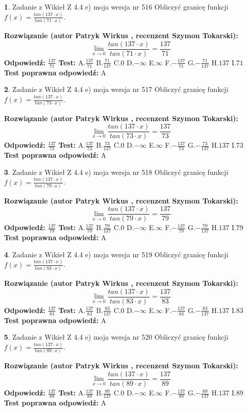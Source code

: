 \documentclass[12pt, a4paper]{article}
\theoremstyle{definition} %
\newtheorem{zad}{}
\newcommand{\zadStart}[1]{\begin{zad}#1\newline}
\newcommand{\zadStop}{\end{zad}}
\newcommand{\rozwStart}[2]{\noindent \textbf{Rozwiązanie (autor #1 , recenzent #2): }\newline}
\newcommand{\rozwStop}{\newline}
\newcommand{\odpStart}{\noindent \textbf{Odpowiedź:}\newline}
\newcommand{\odpStop}{\newline}
\newcommand{\testStart}{\noindent \textbf{Test:}\newline}
\newcommand{\testStop}{\newline}
\newcommand{\kluczStart}{\noindent \textbf{Test poprawna odpowiedź:}\newline}
\newcommand{\kluczStop}{\newline}
\begin{document}
\zadStart{Zadanie z Wikieł Z 4.4 e) moja wersja nr 516}
Obliczyć granicę funkcji $f(x)=\frac{tan(137\cdot x)}{tan(71\cdot x)}$.
\zadStop
\rozwStart{Patryk Wirkus}{Szymon Tokarski}
$$\lim\limits_{x\to 0}\frac{tan(137\cdot x)}{tan(71\cdot x)}=
\frac{137}{71}$$
\rozwStop
\odpStart
$\frac{137}{71}$
\odpStop
\testStart
A.$\frac{137}{71}$
B.$\frac{71}{137}$
C.$0$
D.$-\infty$
E.$\infty$
F.$-\frac{137}{71}$
G.$-\frac{71}{137}$
H.$137$
I.$71$
\testStop
\kluczStart
A
\kluczStop



\zadStart{Zadanie z Wikieł Z 4.4 e) moja wersja nr 517}
Obliczyć granicę funkcji $f(x)=\frac{tan(137\cdot x)}{tan(73\cdot x)}$.
\zadStop
\rozwStart{Patryk Wirkus}{Szymon Tokarski}
$$\lim\limits_{x\to 0}\frac{tan(137\cdot x)}{tan(73\cdot x)}=
\frac{137}{73}$$
\rozwStop
\odpStart
$\frac{137}{73}$
\odpStop
\testStart
A.$\frac{137}{73}$
B.$\frac{73}{137}$
C.$0$
D.$-\infty$
E.$\infty$
F.$-\frac{137}{73}$
G.$-\frac{73}{137}$
H.$137$
I.$73$
\testStop
\kluczStart
A
\kluczStop



\zadStart{Zadanie z Wikieł Z 4.4 e) moja wersja nr 518}
Obliczyć granicę funkcji $f(x)=\frac{tan(137\cdot x)}{tan(79\cdot x)}$.
\zadStop
\rozwStart{Patryk Wirkus}{Szymon Tokarski}
$$\lim\limits_{x\to 0}\frac{tan(137\cdot x)}{tan(79\cdot x)}=
\frac{137}{79}$$
\rozwStop
\odpStart
$\frac{137}{79}$
\odpStop
\testStart
A.$\frac{137}{79}$
B.$\frac{79}{137}$
C.$0$
D.$-\infty$
E.$\infty$
F.$-\frac{137}{79}$
G.$-\frac{79}{137}$
H.$137$
I.$79$
\testStop
\kluczStart
A
\kluczStop



\zadStart{Zadanie z Wikieł Z 4.4 e) moja wersja nr 519}
Obliczyć granicę funkcji $f(x)=\frac{tan(137\cdot x)}{tan(83\cdot x)}$.
\zadStop
\rozwStart{Patryk Wirkus}{Szymon Tokarski}
$$\lim\limits_{x\to 0}\frac{tan(137\cdot x)}{tan(83\cdot x)}=
\frac{137}{83}$$
\rozwStop
\odpStart
$\frac{137}{83}$
\odpStop
\testStart
A.$\frac{137}{83}$
B.$\frac{83}{137}$
C.$0$
D.$-\infty$
E.$\infty$
F.$-\frac{137}{83}$
G.$-\frac{83}{137}$
H.$137$
I.$83$
\testStop
\kluczStart
A
\kluczStop



\zadStart{Zadanie z Wikieł Z 4.4 e) moja wersja nr 520}
Obliczyć granicę funkcji $f(x)=\frac{tan(137\cdot x)}{tan(89\cdot x)}$.
\zadStop
\rozwStart{Patryk Wirkus}{Szymon Tokarski}
$$\lim\limits_{x\to 0}\frac{tan(137\cdot x)}{tan(89\cdot x)}=
\frac{137}{89}$$
\rozwStop
\odpStart
$\frac{137}{89}$
\odpStop
\testStart
A.$\frac{137}{89}$
B.$\frac{89}{137}$
C.$0$
D.$-\infty$
E.$\infty$
F.$-\frac{137}{89}$
G.$-\frac{89}{137}$
H.$137$
I.$89$
\testStop
\kluczStart
A
\kluczStop
\end{document}

